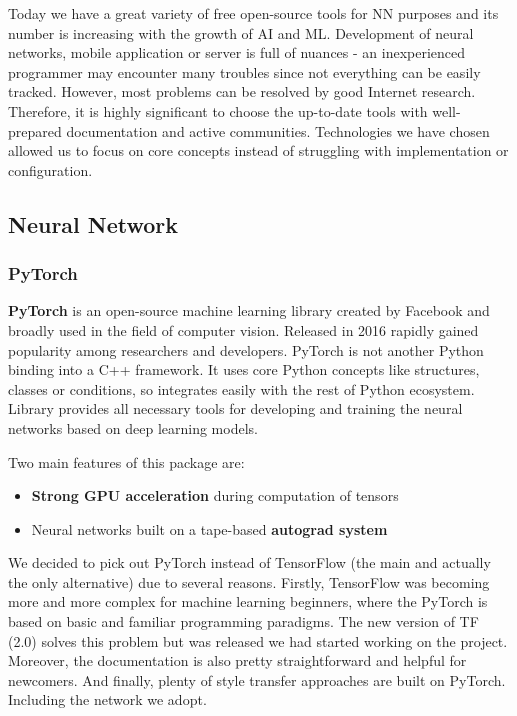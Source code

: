 \documentclass[../Main.tex]{subfiles}
\begin{document}
Today we have a great variety of free open-source tools for NN purposes and its
number is increasing with the growth of AI and ML. Development of neural networks,
mobile application or server is full of nuances - an inexperienced programmer may 
encounter many troubles since not everything can be easily tracked. However, most
problems can be resolved by good Internet research. Therefore, it is highly significant
to choose the up-to-date tools with well-prepared documentation and active communities. 
Technologies we have chosen allowed us to focus on core concepts instead of 
struggling with implementation or configuration.

\subsection{Neural Network}

    \subsubsection{PyTorch}
        \textbf{PyTorch} is an open-source machine learning library created by Facebook and broadly used in the field of computer vision. Released in 2016 \cite{pytorch} rapidly gained popularity among researchers and developers. PyTorch is not another Python binding into a C++ framework. It uses core Python concepts like structures, classes or conditions, so integrates easily with the rest of Python ecosystem. Library provides all necessary tools for developing and training the neural networks based on deep learning models.
        
        Two main features of this package are:
        \begin{itemize}
            \item \textbf{Strong GPU acceleration} during computation of tensors
            \item Neural networks built on a tape-based \textbf{autograd system}
        \end{itemize}
        
        We decided to pick out PyTorch instead of TensorFlow (the main and actually the only alternative) due to several reasons. Firstly, TensorFlow was becoming more and more complex for machine learning beginners, where the PyTorch is based on basic and familiar programming paradigms. The new version of TF (2.0) solves this problem but was released  we had started working on the project. Moreover, the documentation is also pretty straightforward and helpful for newcomers. And finally, plenty of style transfer approaches are built on PyTorch. Including the network we adopt. 
\end{document}

